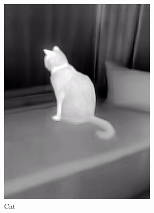 \documentclass{l4proj}
\begin{document}
\begin{figure}[ht]
\begin{subfigure}[h!]{0.18\textwidth}
    \includegraphics[width=\textwidth, trim={0cm 1.6cm 0cm 1.6cm}, clip]{images/dataset/cat/lwir.png}
    \caption{Cat}
  \end{subfigure}
  \begin{subfigure}[h!]{0.18\textwidth}

\end{subfigure}
\end{figure}
\end{document}
